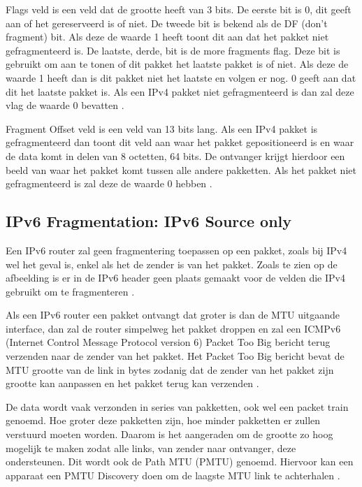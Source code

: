 Flags veld is een veld dat de grootte heeft van 3 bits. De eerste bit is 0, dit geeft aan of het gereserveerd is of niet. De tweede bit is bekend als de DF (don’t fragment) bit. Als deze de waarde 1 heeft toont dit aan dat het pakket niet gefragmenteerd is. De laatste, derde, bit is de more fragments flag. Deze bit is gebruikt om aan te tonen of dit pakket het laatste pakket is of niet. Als deze de waarde 1 heeft dan is dit pakket niet het laatste en volgen er nog. 0 geeft aan dat dit het laatste pakket is. Als een IPv4 pakket niet gefragmenteerd is dan zal deze vlag de waarde 0 bevatten \autocite{Graziani2017}.

Fragment Offset veld is een veld van 13 bits lang. Als een IPv4 pakket is gefragmenteerd dan toont dit veld aan waar het pakket gepositioneerd is en waar de data komt in delen van 8 octetten, 64 bits. De ontvanger krijgt hierdoor een beeld van waar het pakket komt tussen alle andere pakketten. Als het pakket niet gefragmenteerd is zal deze de waarde 0 hebben \autocite{Graziani2017}.

\subsection{IPv6 Fragmentation: IPv6 Source only}

Een IPv6 router zal geen fragmentering toepassen op een pakket, zoals bij IPv4 wel het geval is, enkel als het de zender is van het pakket. Zoals te zien op de afbeelding is er in de IPv6 header geen plaats gemaakt voor de velden die IPv4 gebruikt om te fragmenteren \autocite{Graziani2017}.

Als een IPv6 router een pakket ontvangt dat groter is dan de MTU uitgaande interface, dan zal de router simpelweg het pakket droppen en zal een ICMPv6 (Internet Control Message Protocol version 6) Packet Too Big bericht terug verzenden naar de zender van het pakket. Het Packet Too Big bericht bevat de MTU grootte van de link in bytes zodanig dat de zender van het pakket zijn grootte kan aanpassen en het pakket terug kan verzenden \autocite{Graziani2017}.

De data wordt vaak verzonden in series van pakketten, ook wel een packet train genoemd. Hoe groter deze pakketten zijn, hoe minder pakketten er zullen verstuurd moeten worden. Daarom is het aangeraden om de grootte zo hoog mogelijk te maken zodat alle links, van zender naar ontvanger, deze ondersteunen. Dit wordt ook de Path MTU (PMTU) genoemd. Hiervoor kan een apparaat een PMTU Discovery doen om de laagste MTU link te achterhalen \autocite{Graziani2017}.

